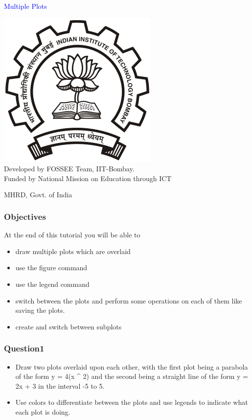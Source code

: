 \documentclass[presentation]{beamer}
\title{}
\author{FOSSEE}
\date{}
\begin{document}
\begin{frame}

\begin{center}
\textcolor{blue}{Multiple Plots}
\end{center}
\begin{center}
\includegraphics[scale=0.25]{../images/iitb-logo.png}\\
Developed by FOSSEE Team, IIT-Bombay. \\ 
Funded by National Mission on Education through ICT

MHRD, Govt. of India
\end{center}
\end{frame}
\begin{frame}
\frametitle{Objectives}
\label{sec-2}

  At the end of this tutorial you will be able to

\begin{itemize}
\item draw multiple plots which are overlaid
\item use the figure command
\item use the legend command
\item switch between the plots and perform some operations on each of them like
    saving the plots.
\item create and switch between subplots
\end{itemize}
\end{frame}
\begin{frame}
\frametitle{Question1}
\label{sec-3}


\begin{itemize}
\item Draw two plots overlaid upon each other, with the first plot
    being a parabola of the form y = 4(x \^{} 2) and the second being a
    straight line of the form y = 2x + 3 in the interval -5 to 5.
\item Use colors to differentiate between the plots and use legends to
    indicate what each plot is doing.
\end{itemize}
\end{frame}
\end{document}
